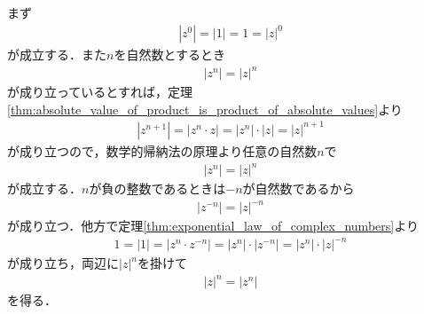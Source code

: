 	\begin{sketch}
		まず
		\begin{align}
			|z^{0}| = |1| = 1 = |z|^{0}
		\end{align}
		が成立する．また$n$を自然数とするとき
		\begin{align}
			|z^{n}| = |z|^{n}
		\end{align}
		が成り立っているとすれば，定理\ref{thm:absolute_value_of_product_is_product_of_absolute_values}より
		\begin{align}
			|z^{n+1}| = |z^{n} \cdot z| = |z^{n}| \cdot |z| = |z|^{n+1}
		\end{align}
		が成り立つので，数学的帰納法の原理より任意の自然数$n$で
		\begin{align}
			|z^{n}| = |z|^{n}
		\end{align}
		が成立する．$n$が負の整数であるときは$-n$が自然数であるから
		\begin{align}
			|z^{-n}| = |z|^{-n}
		\end{align}
		が成り立つ．他方で定理\ref{thm:exponential_law_of_complex_numbers}より
		\begin{align}
			1 = |1| = |z^{n} \cdot z^{-n}| = |z^{n}| \cdot |z^{-n}| = |z^{n}| \cdot |z|^{-n}
		\end{align}
		が成り立ち，両辺に$|z|^{n}$を掛けて
		\begin{align}
			|z|^{n} = |z^{n}|
		\end{align}
		を得る．
		\QED
	\end{sketch}